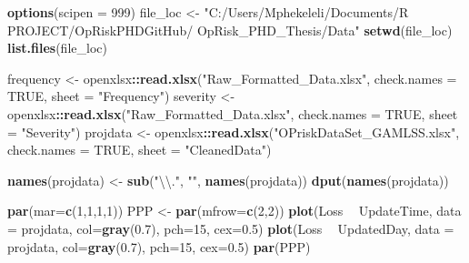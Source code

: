 \documentclass[
]{article}
\newenvironment{Shaded}{\begin{snugshade}}{\end{snugshade}}
\newcommand{\CharTok}[1]{\textcolor[rgb]{0.31,0.60,0.02}{#1}}
\newcommand{\DataTypeTok}[1]{\textcolor[rgb]{0.13,0.29,0.53}{#1}}
\newcommand{\DecValTok}[1]{\textcolor[rgb]{0.00,0.00,0.81}{#1}}
\newcommand{\FloatTok}[1]{\textcolor[rgb]{0.00,0.00,0.81}{#1}}
\newcommand{\KeywordTok}[1]{\textcolor[rgb]{0.13,0.29,0.53}{\textbf{#1}}}
\newcommand{\NormalTok}[1]{#1}
\newcommand{\OperatorTok}[1]{\textcolor[rgb]{0.81,0.36,0.00}{\textbf{#1}}}
\newcommand{\OtherTok}[1]{\textcolor[rgb]{0.56,0.35,0.01}{#1}}
\newcommand{\StringTok}[1]{\textcolor[rgb]{0.31,0.60,0.02}{#1}}
\begin{document}
\begin{Shaded}
\begin{Highlighting}[]
\KeywordTok{options}\NormalTok{(}\DataTypeTok{scipen =} \DecValTok{999}\NormalTok{)}
\NormalTok{file_loc <-}\StringTok{ "C:/Users/Mphekeleli/Documents/R PROJECT/OpRiskPHDGitHub/}
\StringTok{OpRisk_PHD_Thesis/Data"}
\KeywordTok{setwd}\NormalTok{(file_loc)}
\KeywordTok{list.files}\NormalTok{(file_loc)}

\NormalTok{frequency <-}\StringTok{ }\NormalTok{openxlsx}\OperatorTok{::}\KeywordTok{read.xlsx}\NormalTok{(}\StringTok{"Raw_Formatted_Data.xlsx"}\NormalTok{,}
                                 \DataTypeTok{check.names =} \OtherTok{TRUE}\NormalTok{, }\DataTypeTok{sheet =} \StringTok{"Frequency"}\NormalTok{)}
\NormalTok{severity <-}\StringTok{ }\NormalTok{openxlsx}\OperatorTok{::}\KeywordTok{read.xlsx}\NormalTok{(}\StringTok{"Raw_Formatted_Data.xlsx"}\NormalTok{,}
                                \DataTypeTok{check.names =} \OtherTok{TRUE}\NormalTok{, }\DataTypeTok{sheet =} \StringTok{"Severity"}\NormalTok{)}
\NormalTok{projdata <-}\StringTok{ }\NormalTok{openxlsx}\OperatorTok{::}\KeywordTok{read.xlsx}\NormalTok{(}\StringTok{"OPriskDataSet_GAMLSS.xlsx"}\NormalTok{,}
                                \DataTypeTok{check.names =} \OtherTok{TRUE}\NormalTok{, }\DataTypeTok{sheet =} \StringTok{"CleanedData"}\NormalTok{)}

\KeywordTok{names}\NormalTok{(projdata) <-}\StringTok{ }\KeywordTok{sub}\NormalTok{(}\StringTok{"}\CharTok{\textbackslash{}\textbackslash{}}\StringTok{."}\NormalTok{, }\StringTok{""}\NormalTok{, }\KeywordTok{names}\NormalTok{(projdata))}
\KeywordTok{dput}\NormalTok{(}\KeywordTok{names}\NormalTok{(projdata))}

\KeywordTok{par}\NormalTok{(}\DataTypeTok{mar=}\KeywordTok{c}\NormalTok{(}\DecValTok{1}\NormalTok{,}\DecValTok{1}\NormalTok{,}\DecValTok{1}\NormalTok{,}\DecValTok{1}\NormalTok{))}
\NormalTok{PPP <-}\StringTok{ }\KeywordTok{par}\NormalTok{(}\DataTypeTok{mfrow=}\KeywordTok{c}\NormalTok{(}\DecValTok{2}\NormalTok{,}\DecValTok{2}\NormalTok{))}
\KeywordTok{plot}\NormalTok{(Loss }\OperatorTok{~}\StringTok{ }\NormalTok{UpdateTime, }\DataTypeTok{data =}\NormalTok{ projdata, }\DataTypeTok{col=}\KeywordTok{gray}\NormalTok{(}\FloatTok{0.7}\NormalTok{), }\DataTypeTok{pch=}\DecValTok{15}\NormalTok{, }\DataTypeTok{cex=}\FloatTok{0.5}\NormalTok{)}
\KeywordTok{plot}\NormalTok{(Loss }\OperatorTok{~}\StringTok{ }\NormalTok{UpdatedDay, }\DataTypeTok{data =}\NormalTok{ projdata, }\DataTypeTok{col=}\KeywordTok{gray}\NormalTok{(}\FloatTok{0.7}\NormalTok{), }\DataTypeTok{pch=}\DecValTok{15}\NormalTok{, }\DataTypeTok{cex=}\FloatTok{0.5}\NormalTok{)}
\KeywordTok{par}\NormalTok{(PPP)}
\end{Highlighting}
\end{Shaded}
\end{document}
